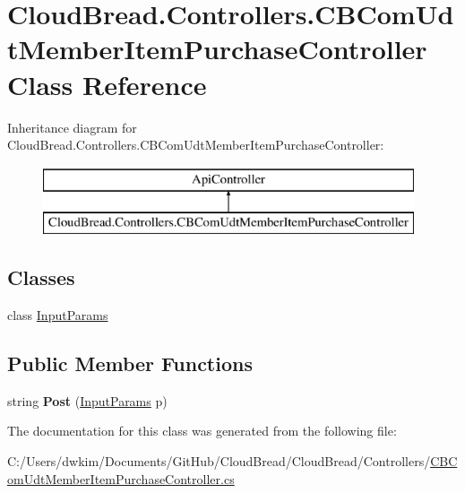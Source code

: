 \hypertarget{a00040}{}\section{Cloud\+Bread.\+Controllers.\+C\+B\+Com\+Udt\+Member\+Item\+Purchase\+Controller Class Reference}
\label{a00040}
Inheritance diagram for Cloud\+Bread.\+Controllers.\+C\+B\+Com\+Udt\+Member\+Item\+Purchase\+Controller\+:\begin{figure}[H]
\begin{center}
\leavevmode
\includegraphics[height=2.000000cm]{a00040}
\end{center}
\end{figure}
\subsection*{Classes}
\begin{DoxyCompactItemize}
\item 
class \hyperlink{a00112}{Input\+Params}
\end{DoxyCompactItemize}
\subsection*{Public Member Functions}
\begin{DoxyCompactItemize}
\item 
string {\bfseries Post} (\hyperlink{a00112}{Input\+Params} p)\hypertarget{a00040_a53e122e0ccbeb2b8991758b8bb1933d9}{}\label{a00040_a53e122e0ccbeb2b8991758b8bb1933d9}

\end{DoxyCompactItemize}


The documentation for this class was generated from the following file\+:\begin{DoxyCompactItemize}
\item 
C\+:/\+Users/dwkim/\+Documents/\+Git\+Hub/\+Cloud\+Bread/\+Cloud\+Bread/\+Controllers/\hyperlink{a00213}{C\+B\+Com\+Udt\+Member\+Item\+Purchase\+Controller.\+cs}\end{DoxyCompactItemize}
